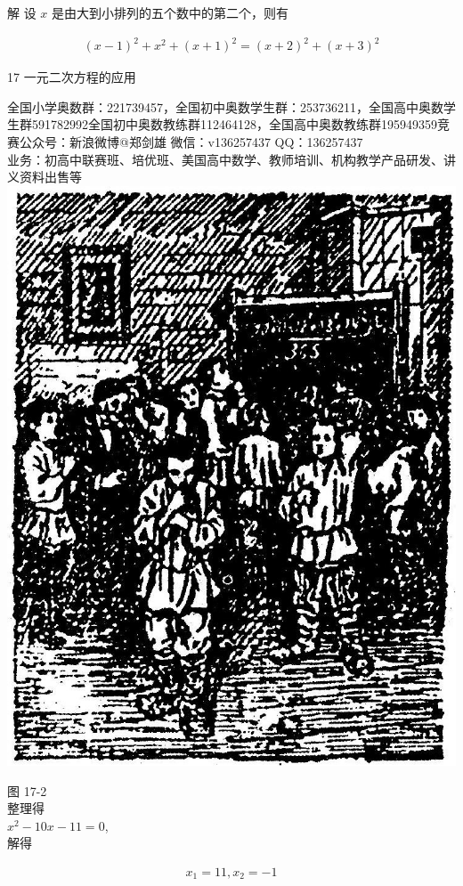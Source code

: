 \documentclass[10pt]{article}
\begin{document}
解 设 $x$ 是由大到小排列的五个数中的第二个，则有

\begin{align*}
(x-1)^{2}+x^{2}+(x+1)^{2}=(x+2)^{2}+(x+3)^{2}
\end{align*}

17 一元二次方程的应用

全国小学奥数群：221739457，全国初中奥数学生群：253736211，全国高中奥数学生群591782992全国初中奥数教练群112464128，全国高中奥数教练群195949359竞赛公众号：新浪微博@郑剑雄 微信：v136257437 QQ：136257437\\
业务：初高中联赛班、培优班、美国高中数学、教师培训、机构教学产品研发、讲义资料出售等\\
\includegraphics[max width=\textwidth, center]{2024_10_30_26b590fd1106d28139f0g-112}

图 17-2\\
整理得\\
$x^{2}-10 x-11=0$,\\
解得

\begin{align*}
x_{1}=11, x_{2}=-1
\end{align*}
\end{document}
